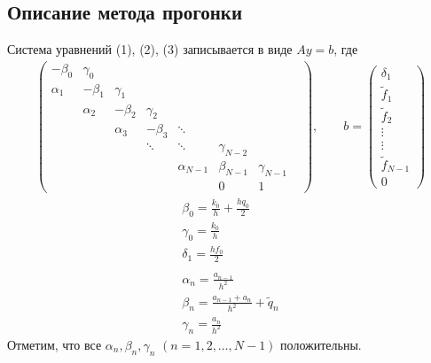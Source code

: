 \documentclass[titlepage]{article}
\begin{document}
\subsection{Описание метода прогонки}
Система уравнений (1), (2), (3) записывается в виде $Ay = b$, где 
\begin{gather}
	\begin{pmatrix}
		-\beta_0 & \gamma_0 & & & & & \\
		\alpha_1 & -\beta_1 & \gamma_1 & & & & \\
		& \alpha_2 & -\beta_2 & \gamma_2 & & & \\
		& & \alpha_3 & -\beta_3 & \ddots & & & \\
		& & & \ddots & \ddots & \gamma_{N-2} & & \\
		& & & & \alpha_{N-1} & \beta_{N-1} & \gamma_{N-1} \\
		& & & & & 0 & 1
	\end{pmatrix}
	, \qquad b = 
	\begin{pmatrix}
		\delta_1 \\ \tilde f_1 \\ \tilde f_2 \\ \vdots \\ \vdots \\ \tilde f_{N-1} \\ 0	
	\end{pmatrix}	
\end{gather}
\begin{gather*}
	\beta_0 = \frac{k_0}{h} + \frac{hq_0}{2} \\
	\gamma_0 = \frac{k_0}{h} \\
	\delta_1 = \frac{hf_0}{2} \\
	\\
	\alpha_n = \frac{a_{n-1}}{h^2} \\ 
	\beta_n = \frac{a_{n-1} + a_n}{h^2} + \tilde q_n \\
	\gamma_n = \frac{a_n}{h^2}
\end{gather*}
Отметим, что все $\alpha_n, \beta_n, \gamma_n$ $(n = 1,2,\dots,N-1)$ положительны. 
\end{document}
